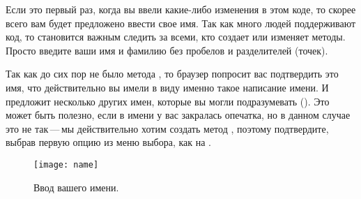 \documentclass[a4paper,10pt,twoside]{book}
\begin{document}
Если это первый раз, когда вы ввели какие-либо изменения в этом коде,
то скорее всего вам будет предложено ввести свое имя.  Так как много
людей поддерживают код, то становится важным следить за всеми, кто
создает или изменяет методы. Просто введите ваши имя и фамилию без
пробелов и разделителей (точек). 



Так как до сих пор не было метода , то браузер попросит вас
подтвердить это имя, что действительно вы имели в виду именно такое
написание имени. И предложит несколько других имен,  которые вы
могли подразумевать (). Это может быть
полезно, если в имени у вас закралась опечатка, но в данном случае это
не так\,---\,мы действительно хотим создать метод , поэтому
подтвердите, выбрав первую опцию из меню выбора,
как на . 



\begin{figure}[htb]
\centerline {\texttt{[image: name]}}
\caption{Ввод вашего имени. }
\end{figure}
\end{document}
